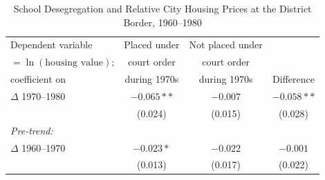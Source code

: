 \documentclass[12pt]{article}
\begin{document}
\bigskip
\begin{table}[hb]
\centering
\caption{School Desegregation and Relative City Housing Prices at the District Border, 1960--1980}
\label{tab:desegregation}
\begin{tabular}{lccc}
\toprule
Dependent variable & Placed under & Not placed under & \\
$= \ln(\text{housing value})$; & court order & court order & \\
coefficient on & during 1970s & during 1970s & Difference \\
\midrule
$\Delta$ 1970--1980 & $-0.065**$ & $-0.007$ & $-0.058**$ \\
     & (0.024) & (0.015) & (0.028) \\[0.5em]
\textit{Pre-trend:} & & & \\
$\Delta$ 1960--1970 & $-0.023*$ & $-0.022$ & $-0.001$ \\
     & (0.013) & (0.017) & (0.022) \\
\bottomrule
\end{tabular}
\end{table}
\end{document}
